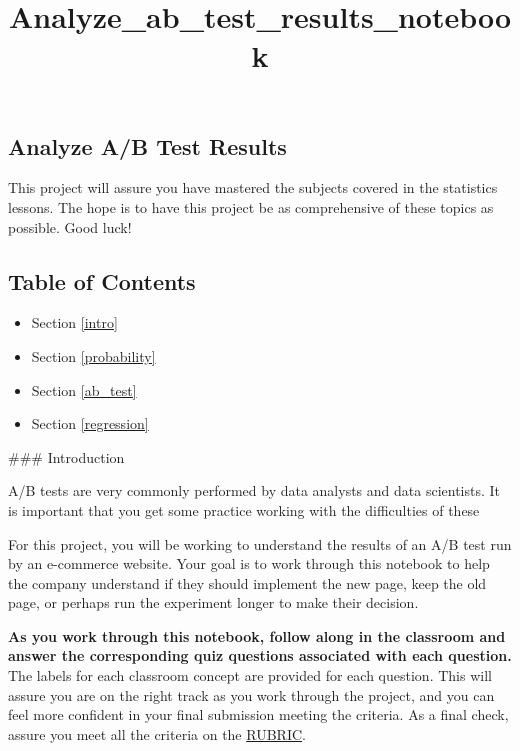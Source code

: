 \documentclass[11pt]{article}
\title{Analyze\_ab\_test\_results\_notebook}
\providecommand{\tightlist}{%
      \setlength{\itemsep}{0pt}\setlength{\parskip}{0pt}}
\begin{document}
    
    
    \maketitle
    
    

    
    \hypertarget{analyze-ab-test-results}{%
\subsection{Analyze A/B Test Results}\label{analyze-ab-test-results}}

This project will assure you have mastered the subjects covered in the
statistics lessons. The hope is to have this project be as comprehensive
of these topics as possible. Good luck!

\hypertarget{table-of-contents}{%
\subsection{Table of Contents}\label{table-of-contents}}

\begin{itemize}
\tightlist
\item
  Section \ref{intro}
\item
  Section \ref{probability}
\item
  Section \ref{ab_test}
\item
  Section \ref{regression}
\end{itemize}

 \#\#\# Introduction

A/B tests are very commonly performed by data analysts and data
scientists. It is important that you get some practice working with the
difficulties of these

For this project, you will be working to understand the results of an
A/B test run by an e-commerce website. Your goal is to work through this
notebook to help the company understand if they should implement the new
page, keep the old page, or perhaps run the experiment longer to make
their decision.

\textbf{As you work through this notebook, follow along in the classroom
and answer the corresponding quiz questions associated with each
question.} The labels for each classroom concept are provided for each
question. This will assure you are on the right track as you work
through the project, and you can feel more confident in your final
submission meeting the criteria. As a final check, assure you meet all
the criteria on the
\href{https://review.udacity.com/\#!/projects/37e27304-ad47-4eb0-a1ab-8c12f60e43d0/rubric}{RUBRIC}.
\end{document}
